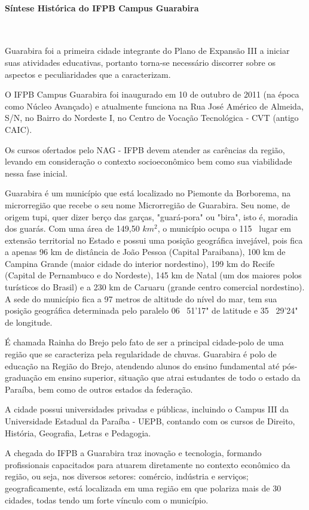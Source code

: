 \paragraph{S\'intese Hist\'orica do IFPB Campus Guarabira}\

	Guarabira foi a primeira cidade integrante do Plano de Expansão III a iniciar suas atividades educativas, portanto torna-se necessário discorrer sobre os aspectos e peculiaridades que a caracterizam.

	O IFPB Campus Guarabira foi inaugurado em 10 de outubro de 2011 (na \'epoca como N\'ucleo Avan\c{c}ado) e atualmente funciona na Rua José Américo de Almeida, S/N, no Bairro do Nordeste I, no Centro de Vocação Tecnológica - CVT (antigo CAIC).

	Os cursos ofertados pelo NAG - IFPB devem atender as carências da região, levando em consideração o contexto socioeconômico bem como sua viabilidade nessa fase inicial.

	Guarabira é um município que está localizado no Piemonte da Borborema, na microrregião que recebe o seu nome Microrregião de Guarabira. Seu nome, de origem tupi, quer dizer berço das garças, "guará-pora" ou "bira", isto é, moradia dos guarás. Com uma área de 149,50 $km^2$, o município ocupa o 115~{\degree} lugar em extensão territorial no Estado e possui uma posição geográfica invejável, pois fica a apenas 96 km de distância de João Pessoa (Capital Paraibana), 100 km de Campina Grande (maior cidade do interior nordestino), 199 km do Recife (Capital de Pernambuco e do Nordeste), 145 km de Natal (um dos maiores polos turísticos do Brasil) e a 230 km de Caruaru (grande centro comercial nordestino). A sede do município fica a 97 metros de altitude do nível do mar, tem sua posição geográfica determinada pelo paralelo 06~{\degree} 51’17" de latitude e 35~{\degree} 29’24" de longitude.

	É chamada Rainha do Brejo pelo fato de ser a principal cidade-polo de uma região que se caracteriza pela regularidade de chuvas. Guarabira é polo de educação na Região do Brejo, atendendo alunos do ensino fundamental até pós-graduação em ensino superior, situação que atrai estudantes de todo o estado da Paraíba, bem como de outros estados da federação.

	A cidade possui universidades privadas e públicas, incluindo o Campus III da Universidade Estadual da Paraíba - UEPB, contando com os cursos de Direito, História, Geografia, Letras e Pedagogia.

	A chegada do IFPB a Guarabira traz inovação e tecnologia, formando profissionais capacitados para atuarem diretamente no contexto econômico da região, ou seja, nos diversos setores: comércio, indústria e serviços; geograficamente, está localizada em uma região em que polariza mais de 30 cidades, todas tendo um forte vínculo com o município.

